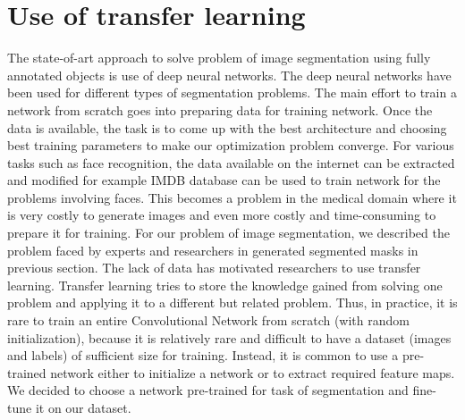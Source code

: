 \section{Use of transfer learning}
The state-of-art approach to solve problem of image segmentation using fully annotated objects is use of deep neural networks. The deep neural networks have been used for different types of segmentation problems. The main effort to train a network from scratch goes into preparing data for training network. Once the data is available, the task is to come up with the best architecture and choosing best training parameters to make our optimization problem converge. For various tasks such as face recognition, the data available on the internet can be extracted and modified for example IMDB database can be used to train network for the problems involving faces. This becomes a problem in the medical domain where it is very costly to generate images and even more costly and time-consuming to prepare it for training. For our problem of image segmentation, we described the problem faced by experts and researchers in generated segmented masks in previous section. The lack of data has motivated researchers to use transfer learning. Transfer learning tries to store the knowledge gained from solving one problem and applying it to a different but related problem. Thus, in practice, it is rare to train an entire Convolutional Network from scratch (with random initialization), because it is relatively rare and difficult to have a dataset (images and labels) of sufficient size for training. Instead, it is common to use a pre-trained network either to initialize a network or to extract required feature maps. We decided to choose a network pre-trained for task of segmentation and fine-tune it on our dataset. 


